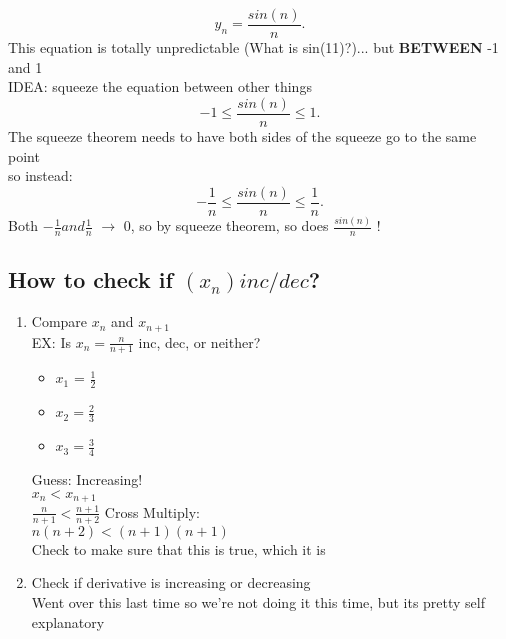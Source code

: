 \documentclass[]{report}
\begin{document}
\begin{list}{}
                    \noindent{} 
                    \[
                            y_n = \frac{sin(n)}{n}
                    .\] 
                    This equation is totally unpredictable (What is sin(11)?)... but \textbf{BETWEEN} -1 and 1 
                    \\
                    \large{IDEA: squeeze the equation between other things}
                    \[
                            -1 \leq \frac{sin(n)}{n} \leq 1
                    .\] 
                    The squeeze theorem needs to have both sides of the squeeze go to the same point 
                    \\
                    so instead:
                    \[
                            -\frac{1}{n} \leq \frac{sin(n)}{n} \leq \frac{1}{n}                    
                    .\] 
                    Both $-\frac{1}{n} and \frac{1}{n}$ $\to$ 0, so by squeeze theorem, so does $\frac{sin(n)}{n}$ !
\end{list}
\subsection*{How to check if $(x_n) inc / dec$?}
\begin{enumerate}
        \item Compare $x_n$ and $x_{n+1}$ 
                \\
                EX: Is $x_n = \frac{n}{n+1}$ inc, dec, or neither?
                \\
                \begin{itemize}
                        \item $x_1 $ = $\frac{1}{2}$ 
                                \item $x_2 = \frac{2}{3}$ 
                                        \item $x_3 = \frac{3}{4}$
                \end{itemize}
                Guess: Increasing!
                \\
                $x_n < x_{n+1}$
                \\
                $\frac{n}{n+1} < \frac{n+1}{n+2}$
                Cross Multiply:
                \\ $n(n+2) < (n+1)(n+1)$
                \\ Check to make sure that this is true, which it is 
        \item Check if derivative is increasing or decreasing 
                \\
                Went over this last time so we're not doing it this time, but its pretty self explanatory 
        
\end{enumerate}
\end{document}
